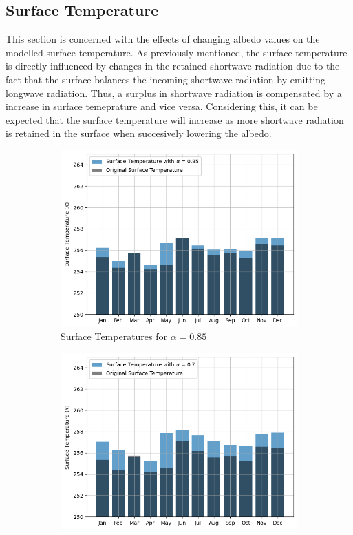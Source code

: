 \documentclass{article}
\begin{document}
\subsection*{Surface Temperature}
This section is concerned with the effects of changing albedo values on the modelled surface temperature. 
As previously mentioned, the surface temperature is directly influenced by changes in the retained shortwave radiation due to the fact that the surface balances the incoming shortwave radiation by emitting longwave radiation. 
Thus, a surplus in shortwave radiation is compensated by a increase in surface temeprature and vice versa. 
Considering this, it can be expected that the surface temperature will increase as more shortwave radiation is retained in the surface when succesively lowering the albedo. \\
\begin{figure}[h!]
  \centering
  \begin{subfigure}{0.49\textwidth}
      \centering
      \includegraphics[width=\linewidth]{figures/Bar_Tsurf_085.png}  %
      \caption{Surface Temperatures for $\alpha = 0.85$}
      \label{fig:SurfaceTemp085}
  \end{subfigure}
  \hfill
  \begin{subfigure}{0.49\textwidth}
      \centering
      \includegraphics[width=\linewidth]{figures/Bar_Tsurf_07.png}  %

\end{subfigure}
\end{figure}
\end{document}
